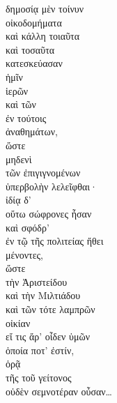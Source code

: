 {\large
\begin{greek}
\noindent δημοσίᾳ μὲν τοίνυν \\
\tabto{2em} οἰκοδομήματα \\
\tabto{4em} καὶ κάλλη τοιαῦτα \\
\tabto{4em} καὶ τοσαῦτα \\
\tabto{2em} κατεσκεύασαν \\
\tabto{4em} ἡμῖν \\
\tabto{4em} ἱερῶν \\
\tabto{4em} καὶ τῶν \\
\tabto{6em} ἐν τούτοις \\
\tabto{4em} ἀναθημάτων, \\
\tabto{6em} ὥστε \\
\tabto{8em} μηδενὶ \\
\tabto{10em} τῶν ἐπιγιγνομένων \\
\tabto{8em} ὑπερβολὴν λελεῖφθαι· \\
ἰδίᾳ δ' \\
\tabto{2em} οὕτω σώφρονες ἦσαν \\
\tabto{2em} καὶ σφόδρ' \\
\tabto{4em} ἐν τῷ τῆς πολιτείας ἤθει \\
\tabto{2em} μένοντες, \\
\tabto{4em} ὥστε \\
\tabto{4em} τὴν Ἀριστείδου \\
\tabto{4em} καὶ τὴν Μιλτιάδου \\
\tabto{4em} καὶ τῶν τότε λαμπρῶν \\
\tabto{4em} οἰκίαν \\
\tabto{6em} εἴ τις ἄρ' οἶδεν ὑμῶν \\
\tabto{8em} ὁποία ποτ' ἐστίν, \\
\tabto{6em} ὁρᾷ \\
\tabto{8em} τῆς τοῦ γείτονος \\
\tabto{6em} οὐδὲν σεμνοτέραν οὖσαν\dots\\
\end{greek}
}

